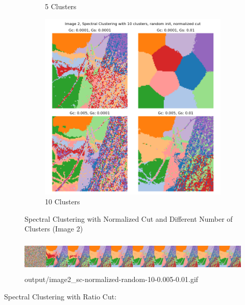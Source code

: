 \documentclass{homework}
\begin{document}
\begin{figure}[H]
\begin{subfigure}{0.32\textwidth}
        \caption{5 Clusters}
    \end{subfigure}
    \begin{subfigure}{0.32\textwidth}
        \centering
        \includegraphics[width=\textwidth]{output_grid/image2_sc-normalized-random-10.png}
        \caption{10 Clusters}
    \end{subfigure}
    \caption{Spectral Clustering with Normalized Cut and Different Number of Clusters (Image 2)}
\end{figure}

\begin{figure}[H]
    \centering
    \includegraphics[height=1.6cm]{output_flatgif/flatgif_image2_sc-normalized-random-10-0.005-0.01.png}
    \caption{output/image2\_sc-normalized-random-10-0.005-0.01.gif}
\end{figure}

Spectral Clustering with Ratio Cut:
\end{document}
